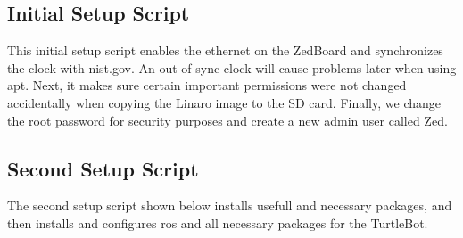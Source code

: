 \documentclass[thesis.tex]{subfile}
\begin{document}
\subsection{Initial Setup Script}
This initial setup script enables the ethernet on the ZedBoard and synchronizes the clock with nist.gov. An out of sync clock will cause problems later when using apt. Next, it makes sure certain important permissions were not changed accidentally when copying the Linaro image to the SD card. Finally, we change the root password for security purposes and create a new admin user called Zed.


\subsection{Second Setup Script}
The second setup script shown below installs usefull and necessary packages, and then installs and configures \gls{ros} and all necessary packages for the TurtleBot.


\end{document}
